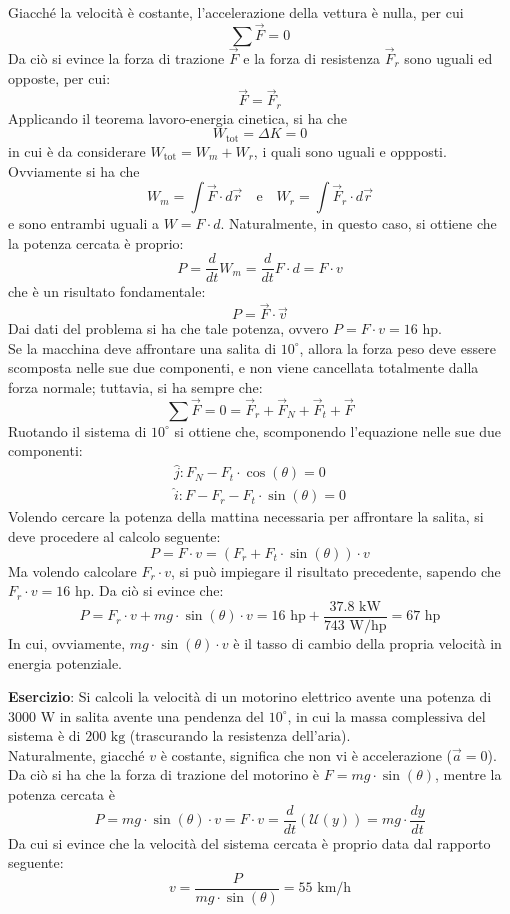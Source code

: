 \documentclass[a4paper]{extarticle}
\begin{document}
\noindent
Giacché la velocità è costante, l'accelerazione della vettura è nulla, per cui
\[\sum \vec F = 0\]
Da ciò si evince la forza di trazione $\vec F$ e la forza di resistenza $\vec F_r$ sono uguali ed opposte, per cui:
\[\vec F = \vec F_r\]
Applicando il teorema lavoro-energia cinetica, si ha che
\[W_{\text{tot}}=\Delta K=0\]
in cui è da considerare $W_{\text{tot}}=W_m+W_r$, i quali sono uguali e oppposti. Ovviamente si ha che
\[W_m = \int \vec F \cdot d \vec r \hspace{1em} \text{e} \hspace{1em} W_r = \int \vec F_r \cdot d \vec r\]
e sono entrambi uguali a $W=F \cdot d$. Naturalmente, in questo caso, si ottiene che la potenza cercata è proprio:
\[P=\frac{d}{dt}W_m=\frac{d}{dt}F \cdot d = F \cdot v\]
che è un risultato fondamentale:
\[\boxed{P=\vec F \cdot \vec v}\]
Dai dati del problema si ha che tale potenza, ovvero $P=F \cdot v = 16 \text{ hp}$.\\
Se la macchina deve affrontare una salita di $10^\circ$, allora la forza peso deve essere scomposta nelle sue due componenti, e non viene cancellata totalmente dalla forza normale; tuttavia, si ha sempre che:
\[\sum \vec F = 0 = \vec F_r + \vec F_N + \vec F_t + \vec F\]
Ruotando il sistema di $10^\circ$ si ottiene che, scomponendo l'equazione nelle sue due componenti:
\begin{align*}
    \hat{j}:F_N - F_t \cdot \cos(\theta) = 0\\
    \hat{i}:F - F_r  - F_t \cdot \sin(\theta) = 0
\end{align*}
Volendo cercare la potenza della mattina necessaria per affrontare la salita, si deve procedere al calcolo seguente:
\[P=F \cdot v=(F_r + F_t \cdot \sin(\theta)) \cdot v\]
Ma volendo calcolare $F_r \cdot v$, si può impiegare il risultato precedente, sapendo che $F_r \cdot v = 16 \text{ hp}$. Da ciò si evince che:
\[P=F_r \cdot v + mg \cdot \sin(\theta) \cdot v = 16 \text{ hp} + \frac{37.8 \text{ kW}}{743 \text{ W/hp}} = 67 \text{ hp}\]
In cui, ovviamente, $mg \cdot \sin(\theta) \cdot v$ è il tasso di cambio della propria velocità in energia potenziale.

\vspace{1em}
\noindent
\textbf{Esercizio}: Si calcoli la velocità di un motorino elettrico avente una potenza di $3000 \text{ W}$ in salita avente una pendenza del $10^\circ$, in cui la massa complessiva del sistema è di $200 \text{ kg}$ (trascurando la resistenza dell'aria).\\
Naturalmente, giacché $v$ è costante, significa che non vi è accelerazione ($\vec a=0$). Da ciò si ha che la forza di trazione del motorino è $F=mg \cdot \sin(\theta)$, mentre la potenza cercata è
\[P = mg \cdot \sin(\theta) \cdot v = F \cdot v = \frac{d}{dt} \left(\mathcal{U}(y)\right) = mg \cdot \frac{dy}{dt}\]
Da cui si evince che la velocità del sistema cercata è proprio data dal rapporto seguente:
\[v = \frac{P}{mg \cdot \sin(\theta)} = 55 \text{ km/h}\]
\end{document}
